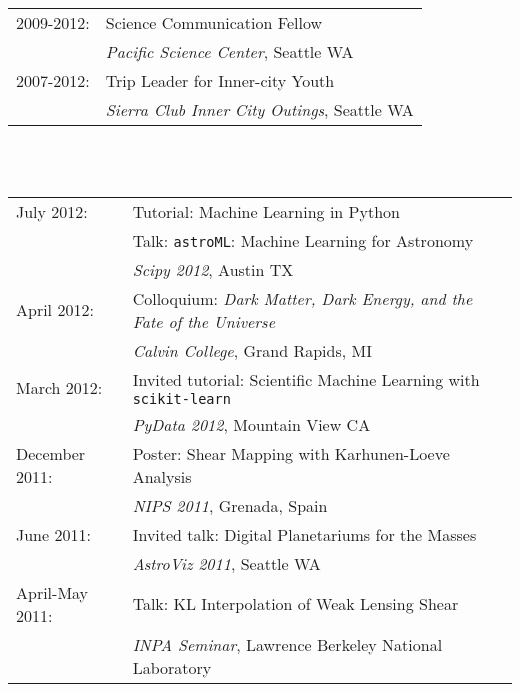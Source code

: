 {\newpage
{}\\
\begin{tabular}{ll}
   2009-2012: & Science Communication Fellow\\
              & \hspace{1cm} {\it Pacific Science Center}, Seattle WA\\
   2007-2012: & Trip Leader for Inner-city Youth\\
              & \hspace{1cm} {\it Sierra Club Inner City Outings}, Seattle WA
\end{tabular}\\

\\
\begin{tabular}{ll}
   July 2012:     & Tutorial: Machine Learning in Python\\
                  & Talk: {\tt astroML}: Machine Learning for Astronomy\\
                  & \hspace{1cm} {\it Scipy 2012}, Austin TX\\
   April 2012:    & Colloquium: {\it Dark Matter, Dark Energy,
                     and the Fate of the Universe}\\
                  & \hspace{1cm} {\it Calvin College}, Grand Rapids, MI\\
   March 2012:    & Invited tutorial: Scientific Machine Learning with
                    {\tt scikit-learn}\\
                  & \hspace{1cm} {\it PyData 2012}, Mountain View CA\\
   December 2011: & Poster: Shear Mapping with Karhunen-Loeve Analysis\\
                  & \hspace{1cm} {\it NIPS 2011}, Grenada, Spain\\
   June 2011:     & Invited talk: Digital Planetariums for the  Masses\\
                  & \hspace{1cm} {\it AstroViz 2011}, Seattle WA\\
   April-May 2011:& Talk: KL Interpolation of Weak Lensing Shear\\
                  & \hspace{1cm} {\it INPA Seminar},
                    Lawrence Berkeley National Laboratory\\

\end{tabular}}
